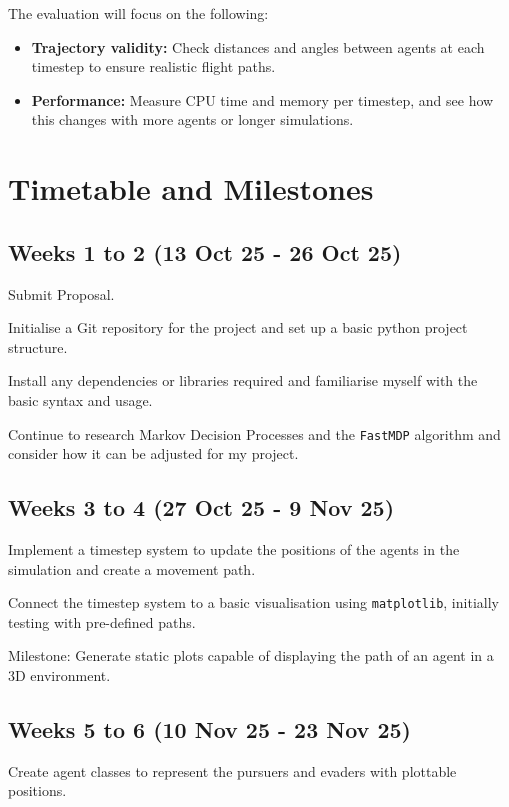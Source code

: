 \begin{refsection}
  The evaluation will focus on the following:

  \begin{itemize}
      \item \textbf{Trajectory validity:} Check distances and angles between agents at each timestep to ensure realistic flight paths.
      \item \textbf{Performance:} Measure CPU time and memory per timestep, and see how this changes with more agents or longer simulations.
  \end{itemize}


  \newpage 


  \section{Timetable and Milestones}

  \subsection*{Weeks 1 to 2 (13 Oct 25 - 26 Oct 25)}
  Submit Proposal.

  Initialise a Git repository for the project and set up a basic python project structure.

  Install any dependencies or libraries required and familiarise myself with the basic syntax and usage.

  Continue to research Markov Decision Processes and the \texttt{FastMDP} algorithm and consider how it can be adjusted for my project.

  \subsection*{Weeks 3 to 4 (27 Oct 25 - 9 Nov 25)}

  Implement a timestep system to update the positions of the agents in the simulation and create a movement path.

  Connect the timestep system to a basic visualisation using \texttt{matplotlib}, initially testing with pre-defined paths.

  Milestone: Generate static plots capable of displaying the path of an agent in a 3D environment.

  \subsection*{Weeks 5 to 6 (10 Nov 25 - 23 Nov 25)}

  Create agent classes to represent the pursuers and evaders with plottable positions.


\end{refsection}
